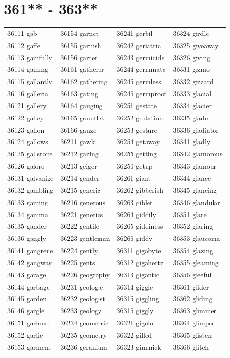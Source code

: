 \documentclass[10pt, oneside]{book}
\begin{document}
\begin{table}
	\centering
	\section*{361** - 363**}
	\begin{tabular}{l l l l}
36111 gab &36154 garnet &36241 gerbil &36324 girdle\\
36112 gaffe &36155 garnish &36242 geriatric &36325 giveaway\\
36113 gainfully &36156 garter &36243 germicide &36326 giving\\
36114 gaining &36161 gatherer &36244 germinate &36331 gizmo\\
36115 gallantly &36162 gathering &36245 germless &36332 gizzard\\
36116 galleria &36163 gating &36246 germproof &36333 glacial\\
36121 gallery &36164 gauging &36251 gestate &36334 glacier\\
36122 galley &36165 gauntlet &36252 gestation &36335 glade\\
36123 gallon &36166 gauze &36253 gesture &36336 gladiator\\
36124 gallows &36211 gawk &36254 getaway &36341 gladly\\
36125 gallstone &36212 gazing &36255 getting &36342 glamorous\\
36126 galore &36213 geiger &36256 getup &36343 glamour\\
36131 galvanize &36214 gender &36261 giant &36344 glance\\
36132 gambling &36215 generic &36262 gibberish &36345 glancing\\
36133 gaming &36216 generous &36263 giblet &36346 glandular\\
36134 gamma &36221 genetics &36264 giddily &36351 glare\\
36135 gander &36222 gentile &36265 giddiness &36352 glaring\\
36136 gangly &36223 gentleman &36266 giddy &36353 glaucoma\\
36141 gangrene &36224 gently &36311 gigabyte &36354 glazing\\
36142 gangway &36225 gents &36312 gigahertz &36355 gleaming\\
36143 garage &36226 geography &36313 gigantic &36356 gleeful\\
36144 garbage &36231 geologic &36314 giggle &36361 glider\\
36145 garden &36232 geologist &36315 giggling &36362 gliding\\
36146 gargle &36233 geology &36316 giggly &36363 glimmer\\
36151 garland &36234 geometric &36321 gigolo &36364 glimpse\\
36152 garlic &36235 geometry &36322 gilled &36365 glisten\\
36153 garment &36236 geranium &36323 gimmick &36366 glitch\\
	\end{tabular}
 \end{table}
\clearpage
\end{document}
